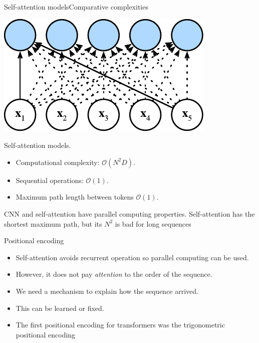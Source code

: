 \documentclass{beamer}
\begin{document}
\begin{frame}{Self-attention models}{Comparative complexities}

\begin{multicols}{2}
\begin{center}
\includegraphics[scale=0.6]{Module 6 (Attention-based networks)/pics/self-attention-complexity.pdf}
\end{center}

\columnbreak
Self-attention models.
\begin{itemize}
    \item Computational complexity: $\mathcal{O}(N^2D)$.
    \item Sequential operations: $\mathcal{O}(1)$.
    \item Maximum path length between tokens $\mathcal{O}(1)$. 
\end{itemize}

\end{multicols}

CNN and self-attention have parallel computing properties. Self-attention has the shortest maximum path, but its $N^2$ is bad for long sequences 

\end{frame}

\begin{frame}{Positional encoding}
\begin{itemize}
    \item Self-attention avoids recurrent operation so parallel computing can be used.
    \item However, it does not pay \emph{attention} to the order of the sequence.
    \item We need a mechanism to explain how the sequence arrived. 
    \item This can be learned or fixed.
    \item The first positional encoding for transformers was the trigonometric positional encoding
    
\end{itemize}
    
\end{frame}
\end{document}
